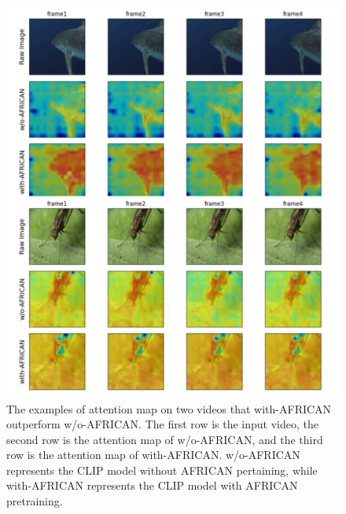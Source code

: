 \begin{figure}[ht]
    \centering
    \includegraphics[width=1.0\textwidth]{assets/charts/4_5_AttentionMaps_1}
    \caption[Attention Map 1 (Good examples)]{The examples of attention map on two videos that with-AFRICAN outperform w/o-AFRICAN. The first row is the input video, the second row is the attention map of w/o-AFRICAN, and the third row is the attention map of with-AFRICAN. w/o-AFRICAN represents the CLIP model without AFRICAN pertaining, while with-AFRICAN represents the CLIP model with AFRICAN pretraining.}
    \label{fig:attnmap1}
\end{figure}

